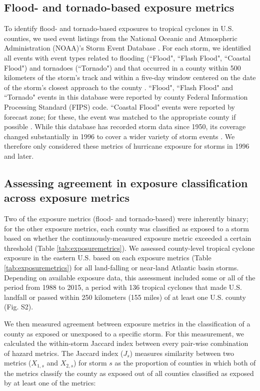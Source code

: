 \documentclass[fleqn,10pt,lineno]{olplainarticle}
\begin{document}
\subsection*{Flood- and tornado-based exposure metrics}

To identify flood- and tornado-based exposures to tropical cyclones in U.S.
counties, we used event listings from the National Oceanic and Atmospheric
Administration (NOAA)'s Storm Event Database \citep{stormevents}. For each
storm, we identified all events with event types related to flooding (``Flood",
``Flash Flood", ``Coastal Flood") and tornadoes (``Tornado") and that occurred
in a county within 500 kilometers of the storm's track and within a five-day
window centered on the date of the storm's closest approach to the county
\citep{hurricaneexposuredata}. ``Flood", ``Flash Flood" and ``Tornado" events in
this database were reported by county Federal Information Processing Standard
(FIPS) code. ``Coastal Flood" events were reported by forecast zone; for these,
the event was matched to the appropriate county if possible
\citep{noaastormevents}. While this database has recorded storm data since 1950,
its coverage changed substantially in 1996 to cover a wider variety of storm
events \citep{stormevents}. We therefore only considered these metrics of
hurricane exposure for storms in 1996 and later.

\subsection*{Assessing agreement in exposure classification across exposure
metrics}

Two of the exposure metrics (flood- and tornado-based) were inherently binary;
for the other exposure metrics, each county was classified as exposed to a storm
based on whether the continuously-measured exposure metric exceeded a certain
threshold (Table \ref{tab:exposuremetrics}). We assessed county-level tropical
cyclone exposure in the eastern U.S. based on each exposure metrics (Table
\ref{tab:exposuremetrics}) for all land-falling or near-land Atlantic basin
storms. Depending on available exposure data, this assessment included some or
all of the period from 1988 to 2015, a period with 136 tropical cyclones that
made U.S. landfall or passed within 250 kilometers (155 miles) of at least one
U.S. county (Fig. S2).

We then measured agreement between exposure metrics in the classification of a
county as exposed or unexposed to a specific storm. For this measurement, we
calculated the within-storm Jaccard index \citep{jaccard1901distribution,
jaccard1908nouvelles} between every pair-wise combination of hazard metrics.
The Jaccard index ($J_s$) measures similarity between two metrics ($X_{1,s}$
and $X_{2,s}$) for storm $s$ as the proportion of counties in which both of the
metrics classify the county as exposed out of all counties classified as
exposed by at least one of the metrics:
\end{document}
